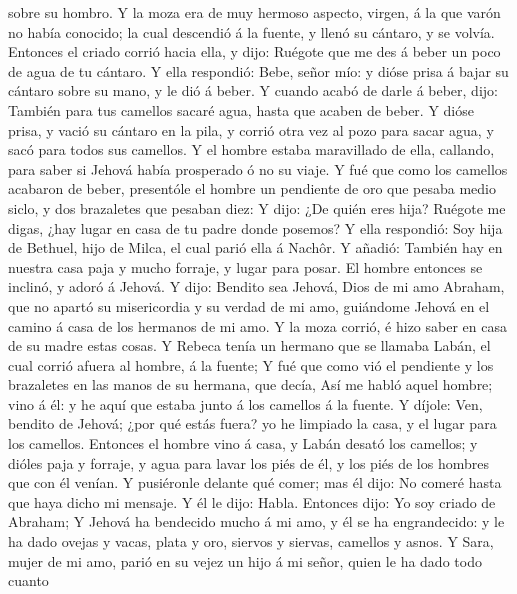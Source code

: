 sobre su hombro.  Y la moza era de muy hermoso aspecto,
virgen, á la que varón no había conocido; la cual descendió á la fuente,
y llenó su cántaro, y se volvía.  Entonces el criado
corrió hacia ella, y dijo: Ruégote que me des á beber un poco de agua de
tu cántaro.  Y ella respondió: Bebe, señor mío: y dióse
prisa á bajar su cántaro sobre su mano, y le dió á beber.
 Y cuando acabó de darle á beber, dijo: También para tus
camellos sacaré agua, hasta que acaben de beber.  Y dióse
prisa, y vació su cántaro en la pila, y corrió otra vez al pozo para
sacar agua, y sacó para todos sus camellos.  Y el hombre
estaba maravillado de ella, callando, para saber si Jehová había
prosperado ó no su viaje.  Y fué que como los camellos
acabaron de beber, presentóle el hombre un pendiente de oro que pesaba
medio siclo, y dos brazaletes que pesaban diez:  Y dijo:
¿De quién eres hija? Ruégote me digas, ¿hay lugar en casa de tu padre
donde posemos?  Y ella respondió: Soy hija de Bethuel,
hijo de Milca, el cual parió ella á Nachôr.  Y añadió:
También hay en nuestra casa paja y mucho forraje, y lugar para posar.
 El hombre entonces se inclinó, y adoró á Jehová.
 Y dijo: Bendito sea Jehová, Dios de mi amo Abraham, que
no apartó su misericordia y su verdad de mi amo, guiándome Jehová en el
camino á casa de los hermanos de mi amo.  Y la moza
corrió, é hizo saber en casa de su madre estas cosas.  Y
Rebeca tenía un hermano que se llamaba Labán, el cual corrió afuera al
hombre, á la fuente;  Y fué que como vió el pendiente y
los brazaletes en las manos de su hermana, que decía, Así me habló aquel
hombre; vino á él: y he aquí que estaba junto á los camellos á la
fuente.  Y díjole: Ven, bendito de Jehová; ¿por qué estás
fuera? yo he limpiado la casa, y el lugar para los camellos.
 Entonces el hombre vino á casa, y Labán desató los
camellos; y dióles paja y forraje, y agua para lavar los piés de él, y
los piés de los hombres que con él venían.  Y pusiéronle
delante qué comer; mas él dijo: No comeré hasta que haya dicho mi
mensaje. Y él le dijo: Habla.  Entonces dijo: Yo soy
criado de Abraham;  Y Jehová ha bendecido mucho á mi amo,
y él se ha engrandecido: y le ha dado ovejas y vacas, plata y oro,
siervos y siervas, camellos y asnos.  Y Sara, mujer de mi
amo, parió en su vejez un hijo á mi señor, quien le ha dado todo cuanto

